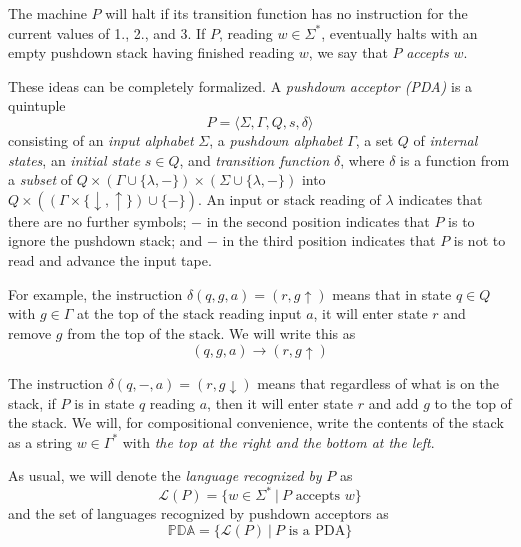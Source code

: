 \documentclass{article}
\newcommand{\El}{\mathcal L}
\begin{document}
The machine $P$ will halt if its transition function has no instruction for the current values of 1., 2., and 3. If $P$, reading $w \in \Sigma^*$, eventually halts with an empty pushdown stack having finished reading $w$, we say that $P$ \emph{accepts} $w$.

These ideas can be completely formalized. A \emph{pushdown acceptor (PDA)} is a quintuple
\begin{equation*}
P = \langle \Sigma, \Gamma, Q, s, \delta \rangle
\end{equation*}
consisting of an \emph{input alphabet} $\Sigma$, a \emph{pushdown alphabet} $\Gamma$, a set $Q$ of \emph{internal states}, an \emph{initial state} $s \in Q$, and \emph{transition function} $\delta$, where $\delta$ is a function from a \emph{subset} of $Q \times (\Gamma \cup \{\lambda,-\}) \times (\Sigma \cup \{\lambda,-\})$ into $Q \times ( (\Gamma \times \{\downarrow,\uparrow\}) \cup \{-\})$. An input or stack reading of $\lambda$ indicates that there are no further symbols; $-$ in the second position indicates that $P$ is to ignore the pushdown stack; and $-$ in the third position indicates that $P$ is not to read and advance the input tape.

For example, the instruction $\delta(q,g,a) = (r,g \uparrow)$ means that in state $q \in Q$ with $g \in \Gamma$ at the top of the stack reading input $a$, it will enter state $r$ and remove $g$ from the top of the stack. We will write this as
\begin{equation*}
(q,g,a) \to (r,g \uparrow)
\end{equation*}

The instruction $\delta(q,-,a) = (r,g \downarrow)$ means that regardless of what is on the stack, if $P$ is in state $q$ reading $a$, then it will enter state $r$ and add $g$ to the top of the stack. We will, for compositional convenience, write the contents of the stack as a string $w \in \Gamma^*$ with \emph{the top at the right and the bottom at the left}.

As usual, we will denote the \emph{language recognized by} $P$ as
\begin{equation*}
\El(P) = \{ w \in \Sigma^*\ |\ P \text{ accepts } w \}
\end{equation*}
and the set of languages recognized by pushdown acceptors as
\begin{equation*}
\mathbb{PDA} = \{ \El(P)\ |\ P \text{ is a PDA} \}
\end{equation*}
\end{document}
